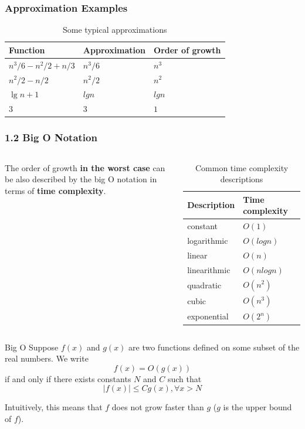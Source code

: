 \documentclass[aspectratio=169, 14pt]{beamer}
\begin{document}
\begin{frame}[fragile]
    \frametitle{Approximation Examples}

    \begin{table}
        \caption{Some typical approximations}
        \begin{tabular}{lll}
          \toprule
          Function & Approximation & Order of growth \\
          \midrule
          $n^3/6 - n^2/2 + n/3$ & $n^3/6$ & $n^3$ \\
          $n^2/2 - n/2$ & $n^2/2$ & $n^2$ \\
          $\lg{n} + 1$ & $lg{n}$ & $lg{n}$ \\
          $3$ & $3$ & $1$ \\
          \bottomrule
        \end{tabular}
    \end{table}
\end{frame}
\begin{frame}
    \frametitle{1.2 Big O Notation}

    \begin{columns}
        The order of growth \textbf{in the worst case} can be also described by the \alert{big O} notation in terms of \textbf{time complexity}. 
        \begin{table}
            \caption{Common time complexity descriptions}
            \begin{tabular}{ll}
              \toprule
              Description & Time complexity \\
              \midrule
              constant	& $O(1)$ \\
        logarithmic	& $O(log{n})$ \\
        linear	& $O(n)$ \\
        linearithmic	& $O(nlog{n})$ \\
        quadratic	& $O(n^2)$ \\
        cubic	& $O(n^3)$ \\
        exponential	& $O(2^n)$ \\
              \bottomrule
            \end{tabular}
        \end{table}
    \end{columns}
\end{frame}

\begin{frame}

\begin{exampleblock}{Big O}
    Suppose $f(x)$ and $g(x)$ are two functions defined on some subset of the real numbers. We write 
\[f(x) = O(g(x))\]
if and only if there exists constants $N$ and $C$ such that
\[|f(x)| \leq Cg(x), \forall x > N\]
\end{exampleblock}


Intuitively, this means that $f$ does not grow faster than $g$ ($g$ is the \alert{upper bound} of $f$).

\end{frame}
\end{document}
